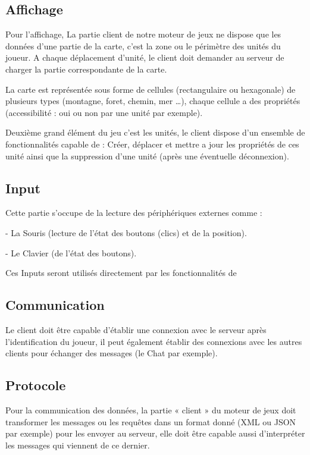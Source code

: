 \documentclass[a4paper,10pt]{report}
\begin{document}
      \subsection{Affichage}

        Pour l’affichage, La partie client de notre moteur de jeux ne dispose que les données d’une partie de la carte, c’est la zone ou le périmètre des unités du joueur. A chaque déplacement d’unité, le client doit demander au serveur de charger la partie  correspondante de la carte.

        La carte est représentée sous forme de cellules (rectangulaire ou hexagonale) de plusieurs types (montagne, foret, chemin, mer …), chaque cellule a des propriétés (accessibilité : oui ou non par une unité par exemple).

        Deuxième grand élément du jeu c’est les unités, le client dispose d’un ensemble de fonctionnalités capable de : Créer, déplacer et mettre a jour les propriétés de ces unité ainsi que la suppression d’une unité (après une éventuelle déconnexion).

      \subsection{Input}

        Cette partie s'occupe de la lecture des périphériques externes comme :

        - La Souris (lecture de l'état des boutons (clics) et de la position).

        - Le Clavier (de l'état des boutons).

        Ces Inputs seront utilisés directement par les fonctionnalités de

      \subsection{Communication}

        Le client doit être capable d’établir une connexion avec le serveur après l’identification du joueur, il peut également établir des connexions avec les autres clients pour échanger des messages (le Chat par exemple).

      \subsection{Protocole}

        Pour la communication des données, la partie « client » du moteur de jeux doit transformer les messages ou les requêtes dans un format donné (XML ou JSON par exemple) pour les envoyer au serveur, elle doit être capable aussi d’interpréter les messages qui viennent de ce dernier.
\end{document}
